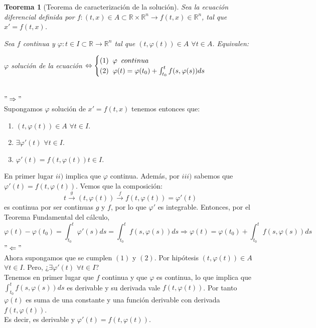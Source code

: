 \documentclass[11pt, a4paper,twoside]{article}
\makeatletter
\theoremstyle{theorem-style}  %
\newtheorem{theorem}{Teorema}[section]  %
\renewenvironment{proof}[1][\proofname]{\par
	\pushQED{\qed}%
	\normalfont \topsep6\p@\@plus6\p@\relax
	\list{}{%
		\settowidth{\leftmargin}{\quad:\hskip\labelsep}%
		\setlength{\labelwidth}{0pt}%
		\setlength{\itemindent}{-\leftmargin}%
	}%
	\item[\hskip\labelsep\itshape#1\@addpunct{:}]\ignorespaces
}{%
	\popQED\endlist\@endpefalse
}
\theoremstyle{definition-style}
\theoremstyle{example-style}
\makeatother
\begin{document}
\begin{theorem}[Teorema de caracterización de la solución]\label{carac-sol}
	Sea la ecuación diferencial definida por $ f:(t,x) \in A \subset \mathbb{R}\times \mathbb{R}^n\longrightarrow f(t,x)\in \mathbb{R}^n$, tal que $ x'=f(t,x) $. 
	
	Sea $f$ continua y $\varphi :t \in I \subset \mathbb{R} \longrightarrow \mathbb{R}^n$ tal que $(t, \varphi (t)) \in A$ $\forall t \in A$. Equivalen:
	\begin{center}
		$\varphi$ solución de la ecuación $\Leftrightarrow \begin{cases}
		(1) \hspace{0,2cm} \varphi \hspace{0,2cm} continua \\
		(2) \hspace{0,2cm} \varphi (t)= \varphi (t_0) + \int_{t_0}^{t} f(s, \varphi (s))ds
		\end{cases}$
	\end{center}
\end{theorem}
\begin{proof}\ \\
	$"\Rightarrow"$ \\
	Supongamos $\varphi$ solución de $x' = f(t, x)$ tenemos entonces que:
	\begin{enumerate}[\qquad i)]
	\item $(t, \varphi (t)) \in A$ $\forall t \in I$.
	\item $ \exists \varphi' (t)$ $\forall t \in I$.
	\item $ \varphi' (t) = f(t, \varphi (t)) t \in I$.
	\end{enumerate}
	En primer lugar $ii)$ implica que $\varphi$ continua. Además, por $iii)$ sabemos que $\varphi' (t) = f(t, \varphi (t))$. Vemos que la composición:
	\[t \stackrel{g}{\longrightarrow } (t, \varphi (t)) \stackrel{f}{\longrightarrow } f(t, \varphi (t)) = \varphi'(t)\]
	es continua por ser continuas $g$ y $f$, por lo que $\varphi '$ es integrable. Entonces, por el Teorema Fundamental del cálculo,
	\[\varphi (t) - \varphi (t_0) = \int_{t_0}^{t} \varphi' (s)ds = \int_{t_0}^{t} f(s, \varphi (s))ds \Rightarrow \varphi (t) = \varphi (t_0) + \int_{t_0}^{t} f(s, \varphi (s))ds\]
	$"\Leftarrow"$ \\
	Ahora supongamos que se cumplen $(1)$ y $(2)$. Por hipótesis $(t, \varphi (t)) \in A$ $\forall t \in I$. Pero, ¿$\exists \varphi' (t)$ $\forall t \in I$?\\
	Tenemos en primer lugar que $f$ continua y que $\varphi$ es continua, lo que implica que $\int_{t_0}^{t} f(s, \varphi (s))ds$ es derivable y su derivada vale $f(t, \varphi (t))$. Por tanto $\varphi (t)$ es suma de una constante y una función derivable con derivada $ f(t,\varphi(t)) $. \\
	Es decir, es derivable y $\varphi' (t) = f(t, \varphi (t))$.
\end{proof}
\end{document}
